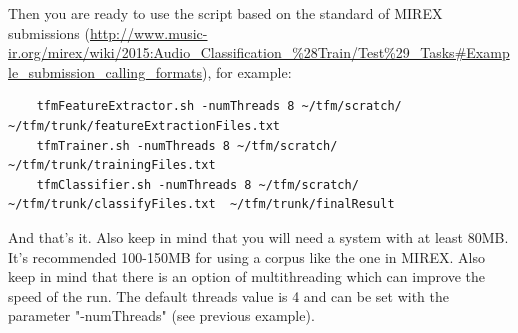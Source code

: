 \documentclass[a4paper,openany,oneside,12pt]{book}
\begin{document}
Then you are ready to use the script based on the standard of MIREX submissions (\url{http://www.music-ir.org/mirex/wiki/2015:Audio_Classification_%28Train/Test%29_Tasks#Example_submission_calling_formats}), for example:
   \lstset{language=Bash,
           basicstyle=\ttfamily\scriptsize,
           keywordstyle=\ttfamily,
           stringstyle=\ttfamily,
           commentstyle=\ttfamily,
          breaklines=true
          }
\begin{lstlisting}
	tfmFeatureExtractor.sh -numThreads 8 ~/tfm/scratch/ ~/tfm/trunk/featureExtractionFiles.txt
	tfmTrainer.sh -numThreads 8 ~/tfm/scratch/ ~/tfm/trunk/trainingFiles.txt
	tfmClassifier.sh -numThreads 8 ~/tfm/scratch/ ~/tfm/trunk/classifyFiles.txt  ~/tfm/trunk/finalResult
\end{lstlisting}
	
And that's it. Also keep in mind that you will need a system with at least 80MB. It's recommended 100-150MB for using a corpus like the one in MIREX. Also keep in mind that there is an option of multithreading which can improve the speed of the run. The default threads value is 4 and can be set with the parameter "-numThreads" (see previous example).
\end{document}
